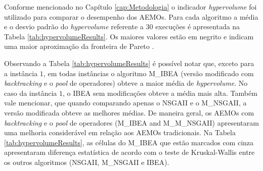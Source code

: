Conforme mencionado no Capítulo \ref{cap:Metodologia} o indicador \textit{hypervolume} foi utilizado para comparar o desempenho dos AEMOs. Para cada algoritmo a média e o desvio padrão do \textit{hypervolume}  referente a 30 execuções é apresentada na Tabela \ref{tab:hypervolumeResults}. Os maiores valores estão em negrito e indicam uma maior aproximação da fronteira de Pareto \cite{barr1998economics}.

Observando a Tabela \ref{tab:hypervolumeResults} é possível notar que, exceto para a instância $1$, em todas instâncias o algoritmo M\_IBEA (versão modificado com \textit{backtracking} e o \textit{pool} de operadores) obteve a maior média de \textit{hypervolume}. No caso da instância $1$, o IBEA sem modificações obteve a média mais alta. Também vale mencionar, que quando comparando apenas o NSGAII e o M\_NSGAII, a versão modificada obteve as melhores médias. De maneira geral, os AEMOs com \textit{backtracking} e o \textit{pool} de operadores (M\_IBEA and M\_M_NSGAII) apresentaram uma melhoria considerável em relação aos AEMOs tradicionais. Na Tabela \ref{tab:hypervolumeResults}, as células do M\_IBEA que estão marcados com cinza apresentaram diferença estatística de acordo com o teste de  Kruskal-Wallis \cite{mckight2010kruskal} entre os outros algoritmos (NSGAII, M\_NSGAII e IBEA).


